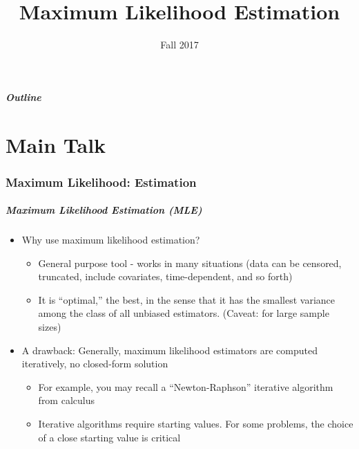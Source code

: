 \documentclass{beamer}
\title[Inference]{Maximum Likelihood Estimation}
\date[Fall 2017]{Fall 2017}
\begin{document}
\frame{\titlepage}

\begin{frame}
  \frametitle{Outline}
     \tableofcontents[part=1]
\end{frame}

\part<presentation>{Main Talk}

\section{Maximum Likelihood: Estimation}

\begin{frame}[shrink=2]
\frametitle{Maximum Likelihood Estimation (MLE)}
\begin{itemize}
\item Why use maximum likelihood estimation? \vspace{2mm}
\begin{itemize}
\item General purpose tool - works in many situations (data can be censored, truncated, include covariates, time-dependent, and so
forth) \vspace{2mm}

\item It is ``optimal,'' the best, in the sense that it has the smallest variance among the class of all unbiased estimators. (Caveat: for large sample
sizes) \vspace{2mm}
\end{itemize}
\item A drawback: Generally, maximum likelihood estimators are computed iteratively, no closed-form
solution \vspace{2mm}
\begin{itemize}
\item For example, you may recall a ``Newton-Raphson'' iterative algorithm from
calculus \vspace{2mm}

\item Iterative algorithms require starting values. For some problems, the choice of a close starting value is critical
\end{itemize}
\end{itemize}
\end{frame}
\end{document}

